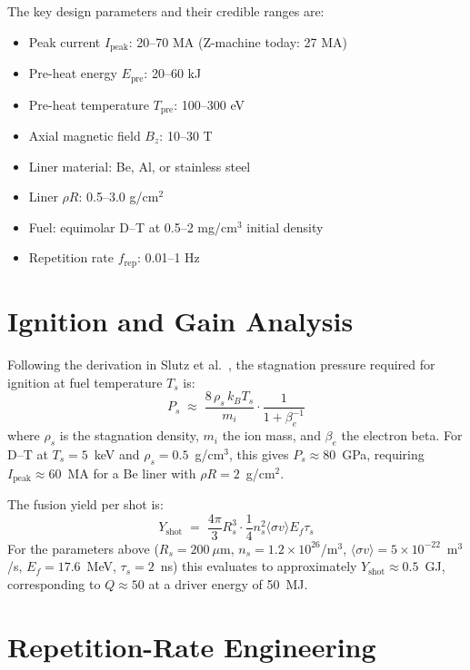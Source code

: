 \documentclass[11pt]{article}
\begin{document}
The key design parameters and their credible ranges are:

\begin{itemize}
\item Peak current $I_\text{peak}$: 20--70 MA (Z-machine today: 27 MA)
\item Pre-heat energy $E_\text{pre}$: 20--60 kJ
\item Pre-heat temperature $T_\text{pre}$: 100--300 eV
\item Axial magnetic field $B_z$: 10--30 T
\item Liner material: Be, Al, or stainless steel
\item Liner $\rho R$: 0.5--3.0 g/cm$^2$
\item Fuel: equimolar D--T at 0.5--2 mg/cm$^3$ initial density
\item Repetition rate $f_\text{rep}$: 0.01--1 Hz
\end{itemize}

\section{Ignition and Gain Analysis}

Following the derivation in Slutz et al.~\cite{slutz2012}, the stagnation
pressure required for ignition at fuel temperature $T_s$ is:
\begin{equation}
  P_s \;\approx\; \frac{8\, \rho_s\, k_B T_s}{m_i}
                 \cdot \frac{1}{1 + \beta_e^{-1}}
\end{equation}
where $\rho_s$ is the stagnation density, $m_i$ the ion mass, and
$\beta_e$ the electron beta. For D--T at $T_s = 5$~keV and
$\rho_s = 0.5$~g/cm$^3$, this gives $P_s \approx 80$~GPa, requiring
$I_\text{peak} \approx 60$~MA for a Be liner with $\rho R = 2$~g/cm$^2$.

The fusion yield per shot is:
\begin{equation}
  Y_\text{shot} \;=\; \frac{4\pi}{3} R_s^3 \cdot \frac{1}{4} n_s^2
                    \langle \sigma v \rangle E_f \tau_s
\end{equation}
For the parameters above ($R_s = 200~\mu$m, $n_s = 1.2 \times 10^{26}$/m$^3$,
$\langle \sigma v \rangle = 5 \times 10^{-22}$~m$^3$/s, $E_f = 17.6$~MeV,
$\tau_s = 2$~ns) this evaluates to approximately $Y_\text{shot} \approx
0.5$~GJ, corresponding to $Q \approx 50$ at a driver energy of 50~MJ.

\section{Repetition-Rate Engineering}
\end{document}
